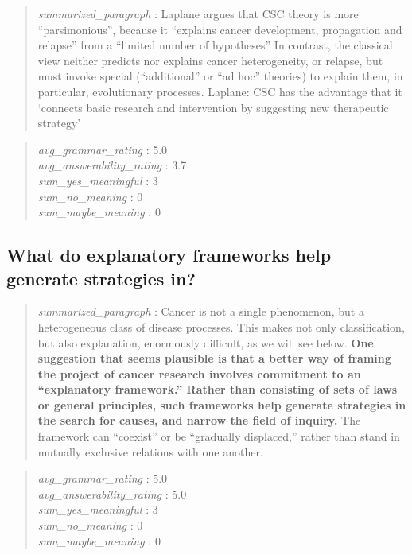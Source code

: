 \begin{quote}
\emph{summarized\_paragraph} : Laplane argues that CSC theory is more
``parsimonious'', because it ``explains cancer development, propagation
and relapse'' from a ``limited number of hypotheses'' In contrast, the
classical view neither predicts nor explains cancer heterogeneity, or
relapse, but must invoke special (``additional'' or ``ad hoc'' theories)
to explain them, in particular, evolutionary processes. Laplane: CSC has
the advantage that it `connects basic research and intervention by
suggesting new therapeutic strategy'
\end{quote}

\begin{quote}
\emph{avg\_grammar\_rating} : 5.0\\
\emph{avg\_answerability\_rating} : 3.7\\
\emph{sum\_yes\_meaningful} : 3\\
\emph{sum\_no\_meaning} : 0\\
\emph{sum\_maybe\_meaning} : 0
\end{quote}

\hypertarget{what-do-explanatory-frameworks-help-generate-strategies-in}{%
\subsection{What do explanatory frameworks help generate strategies
in?}\label{what-do-explanatory-frameworks-help-generate-strategies-in}}

\begin{quote}
\emph{summarized\_paragraph} : Cancer is not a single phenomenon, but a
heterogeneous class of disease processes. This makes not only
classification, but also explanation, enormously difficult, as we will
see below. \textbf{One suggestion that seems plausible is that a better
way of framing the project of cancer research involves commitment to an
``explanatory framework.'' Rather than consisting of sets of laws or
general principles, such frameworks help generate strategies in the
search for causes, and narrow the field of inquiry.} The framework can
``coexist'' or be ``gradually displaced,'' rather than stand in mutually
exclusive relations with one another.
\end{quote}

\begin{quote}
\emph{avg\_grammar\_rating} : 5.0\\
\emph{avg\_answerability\_rating} : 5.0\\
\emph{sum\_yes\_meaningful} : 3\\
\emph{sum\_no\_meaning} : 0\\
\emph{sum\_maybe\_meaning} : 0
\end{quote}

